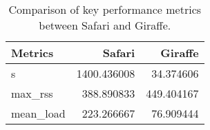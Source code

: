 \begin{table}
\centering
\caption{Comparison of key performance metrics between Safari and Giraffe.}
\label{tab:key_metrics_comparison}
\begin{tabular}{lrr}
\toprule
  Metrics &      Safari &    Giraffe \\
\midrule
        s & 1400.436008 &  34.374606 \\
  max\_rss &  388.890833 & 449.404167 \\
mean\_load &  223.266667 &  76.909444 \\
\bottomrule
\end{tabular}
\end{table}
